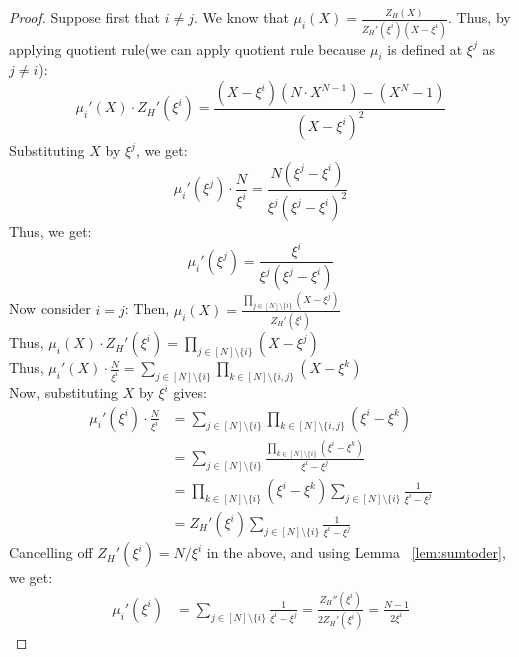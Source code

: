 \begin{proof}
    Suppose first that $i \neq j$.
    We know that $\mu_i(X)= \frac{Z_H(X)}{Z_H'(\xi^i)(X-\xi^i)}$.
    Thus, by applying quotient rule(we can apply quotient rule because $\mu_i$ is defined at $\xi^j$ as $j\neq i$):
    $$\mu_i'(X) \cdot Z_H'(\xi^i)= \frac{(X-\xi^i)(N\cdot X^{N-1})-(X^N-1)}{(X-\xi^i)^2}$$
    Substituting $X$ by $\xi^j$, we get:
    $$\mu_i'(\xi^j) \cdot \frac{N}{\xi^i}= \frac{N(\xi^j-\xi^i)}{\xi^j (\xi^j-\xi^i)^2}$$
    Thus, we get:
    $$\mu_i'(\xi^j)=\frac{\xi^i}{\xi^j(\xi^j-\xi^i)}$$
    Now consider $i=j$:
    Then, $\mu_i(X)=\frac{\prod_{j \in [N] \setminus \{i\}}(X-\xi^j)}{Z_H'(\xi^i)}$\\
    Thus,  $\mu_i(X)\cdot Z_H'(\xi^i)=\prod_{j \in [N] \setminus \{i\}}(X-\xi^j)$\\
    Thus, $\mu_i'(X) \cdot \frac{N}{\xi^i}=\sum_{j \in [N] \setminus \{i\}}\prod_{k \in [N]\setminus\{i,j\}}(X-\xi^k)$\\
    Now, substituting $X$ by $\xi^i$ gives:
    \begin{align*}
        \mu_i'(\xi^i) \cdot \frac{N}{\xi^i} &= \sum_{j \in [N] \setminus \{i\}}\prod_{k \in [N]\setminus\{i,j\}}(\xi^i-\xi^k) \\
        &=\sum_{j \in [N] \setminus \{i\}}\frac{\prod_{k \in [N]\setminus\{i\}}(\xi^i-\xi^k)}{\xi^i-\xi^j} \\
        &= \prod_{k \in [N]\setminus\{i\}}(\xi^i-\xi^k)\sum_{j\in [N]\setminus \{i\}}\frac{1}{\xi^i-\xi^j} \\
        &=Z_H'(\xi^i)\sum_{j\in [N]\setminus \{i\}}\frac{1}{\xi^i-\xi^j}
    \end{align*}
    Cancelling off $Z_H'(\xi^i)=N/\xi^i$ in the above, and using Lemma ~\ref{lem:sumtoder}, we get:
    \begin{align*}
        \mu_i'(\xi^i) &= \sum_{j\in [N]\setminus \{i\}}\frac{1}{\xi^i-\xi^j} =\frac{Z_H''(\xi^i)}{2 Z_H'(\xi^i)}
        =\frac{N-1}{2\xi^i}
    \end{align*}

\end{proof}

